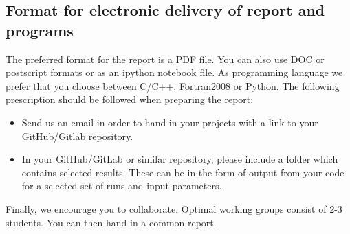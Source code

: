 \documentclass[%
oneside,                 %
final,                   %
10pt]{article}
\begin{document}
\noindent
\subsection*{Format for electronic delivery of report and programs}

The preferred format for the report is a PDF file. You can also use DOC or postscript formats or as an ipython notebook file.  As programming language we prefer that you choose between C/C++, Fortran2008 or Python. The following prescription should be followed when preparing the report:

\begin{itemize}
  \item Send us an email in order  to hand in your projects with a link to your GitHub/Gitlab repository.

  \item In your GitHub/GitLab or similar repository, please include a folder which contains selected results. These can be in the form of output from your code for a selected set of runs and input parameters.
\end{itemize}

\noindent
Finally, 
we encourage you to collaborate. Optimal working groups consist of 
2-3 students. You can then hand in a common report. 


\end{document}
